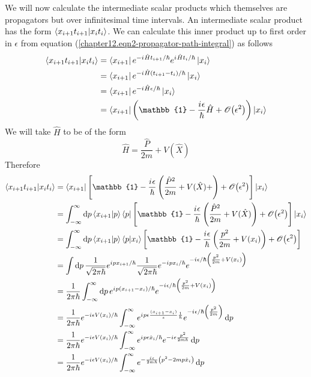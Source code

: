 	We will now calculate the intermediate scalar products which themselves are propagators but over infinitesimal time intervals. An intermediate scalar product has the form $\braket{x_{i+1} t_{i+1}}{x_i t_i}$. We can calculate this inner product up to first order in $\epsilon$ from equation (\ref{chapter12.eqn2-propagator-path-integral}) as follows
	\begin{align}
		\braket{x_{i+1} t_{i+1}}{x_i t_i} &= \bra{x_{i+1}} e^{-\iu \hat{H}t_{i+1}/\hbar}e^{\iu \hat{H}t_{i}/\hbar}\ket{x_i}\\
		&= \bra{x_{i+1}} e^{-\iu \hat{H}(t_{i+1} - t_i)/\hbar}\ket{x_i}\\
		&= \bra{x_{i+1}} e^{-\iu \hat{H}\epsilon/\hbar}\ket{x_i}\\
		&= \bra{x_{i+1}} \left(\mathbb{1} - \frac{\iu \epsilon}{\hbar}\hat{H} + \order{\epsilon^2}\right)\ket{x_i}
	\end{align}
	We will take $\hat{H}$ to be of the form
	\begin{equation}
		\hat{H} = \frac{\hat{P}}{2 m} + V(\hat{X})
	\end{equation}
	Therefore
	\begin{align}
		\braket{x_{i+1} t_{i+1}}{x_i t_i} 
		&= \bra{x_{i+1}}\left[\mathbb{1} - \frac{\iu \epsilon}{\hbar}\left(\frac{\hat{P}^2}{2 m} + V(\hat{X}) + \right) + \order{\epsilon^2}\right]\ket{x_i}\\
		&= \int_{-\infty}^{\infty} \dd{p} \braket{x_{i+1}}{p} \bra{p} \left[\mathbb{1} - \frac{\iu \epsilon}{\hbar}\left(\frac{\hat{P}^2}{2 m} + V(\hat{X})\right) + \order{\epsilon^2}\right] \ket{x_i} \\
		&= \int_{-\infty}^{\infty} \dd{p} \braket{x_{i+1}}{p} \braket{p}{x_i} \left[\mathbb{1} - \frac{\iu \epsilon}{\hbar}\left(\frac{p^2}{2 m} + V(x_i)\right) + \order{\epsilon^2}\right]  \\
		&= \int \dd{p} \frac{1}{\sqrt{2\pi \hbar}}e^{\iu p x_{i+1}/\hbar}\frac{1}{\sqrt{2\pi \hbar}}e^{-\iu p x_{i}/\hbar} e^{-\iu \epsilon/\hbar \left( \frac{p^2}{2 m} + V(x_i) \right)} \\
		&= \frac{1}{2\pi\hbar} \int_{-\infty}^{\infty} \dd{p} e^{\iu p (x_{i+1} - x_i)/\hbar} e^{-\iu \epsilon/\hbar \left( \frac{p^2}{2 m} + V(x_i) \right)} \\
		&= \frac{1}{2\pi\hbar} e^{-\iu \epsilon V(x_i)/\hbar} \int_{-\infty}^{\infty} e^{\iu p \epsilon\frac{(x_{i+1} - x_i)}{\epsilon}\frac{1}{\hbar}} e^{-\iu \epsilon/\hbar \left( \frac{p^2}{2 m}\right)} \dd{p}\\
		&= \frac{1}{2\pi\hbar} e^{-\iu \epsilon V(x_i)/\hbar} \int_{-\infty}^{\infty} e^{\iu p \epsilon \dot{x}_i / \hbar} e^{-\iu \epsilon \frac{p^2}{2 m \hbar}} \dd{p} \\
		&= \frac{1}{2\pi\hbar} e^{-\iu \epsilon V(x_i)/\hbar} \int_{-\infty}^{\infty} e^{-\frac{\iu \epsilon}{2 m \hbar} \left(p^2 - 2 m p \dot{x}_i \right)} \dd{p}
		\label{chapter12.eqn6-path-integral-propagator}
	\end{align}
